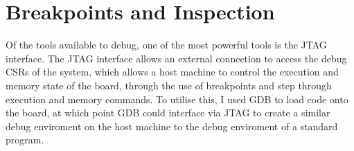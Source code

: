 \section{Breakpoints and Inspection}
Of the tools available to debug, one of the most powerful tools is the JTAG interface. The JTAG interface allows an external connection to access the debug CSRs of the system, which allows a host machine to control the execution and memory state of the board, through the use of breakpoints and step through execution and memory commands. To utilise this, I used GDB to load code onto the board, at which point GDB could interface via JTAG to create a similar debug enviroment on the host machine to the debug enviroment of a standard program. 
